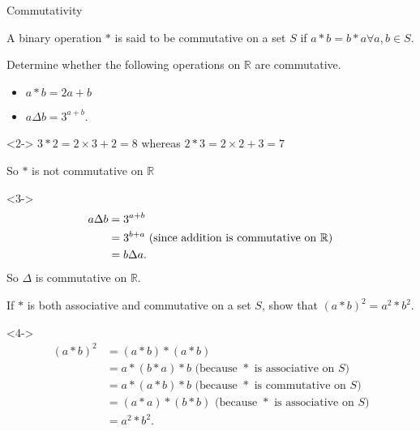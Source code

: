 \documentclass[8pt]{beamer}
\newcommand{\R}{\mathbb{R}}
\begin{document}
\begin{frame}[shrink]{Commutativity}
	\begin{definition}
		A binary operation $*$ is said to be commutative on a set  $S$ if  $a*b=b*a \forall a,b \in S$.
	\end{definition}
	\begin{problem}
		Determine whether the following operations on $\R$ are commutative.
		\begin{itemize}
			\item $a*b=2a+b$
			\item  $a\Delta b = 3^{a+b}$.
		\end{itemize}
	\end{problem}
	\begin{solution}<2->
		$3*2=2\times 3 +2 =8$ whereas $2*3= 2\times 2+3=7$

		So $*$ is not commutative on  $\R$
	\end{solution}
	\begin{solution}<3->
		\begin{align*}
			a\Delta b &= 3^{a+b} \\
				  &= 3^{b+a} \text{ (since addition is commutative on $ \R$)} \\
				  &= b\Delta a 
		.\end{align*}
So $\Delta$ is commutative on  $\R$.

	\end{solution}

	\begin{problem}
		If $*$ is both associative and commutative on a set  $S$, show that  $(a*b)^2=a^2*b^2.$
	\end{problem}

	\begin{solution}<4->
		\begin{align*}
			(a*b)^2&=(a*b)*(a*b)\\
			       &= a*(b*a)*b \text{ (because $*$ is associative on  $S$)} \\
			       &= a*(a*b)*b \text{ (because $*$ is commutative on  $S$)} \\
			       &= (a*a)*(b*b) \text{ (because $*$ is associative on  $S$)} \\
			       &= a^2*b^2  
		.\end{align*}
		
	\end{solution}
\end{frame}
\end{document}
